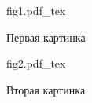 \documentclass[12pt,a4paper]{article}
\newcommand{\incfig}[1]{%
    \def\svgwidth{\columnwidth}
    {#1.pdf_tex}
}
\begin{document}
\begin{figure}[ht]
    \centering
    \incfig{fig1}
    \caption{Первая картинка}
    \label{fig:fig1}
\end{figure}

\begin{figure}[ht]
    \centering
    \incfig{fig2}
    \caption{Вторая картинка}
    \label{fig:fig2}
\end{figure}
\end{document}
